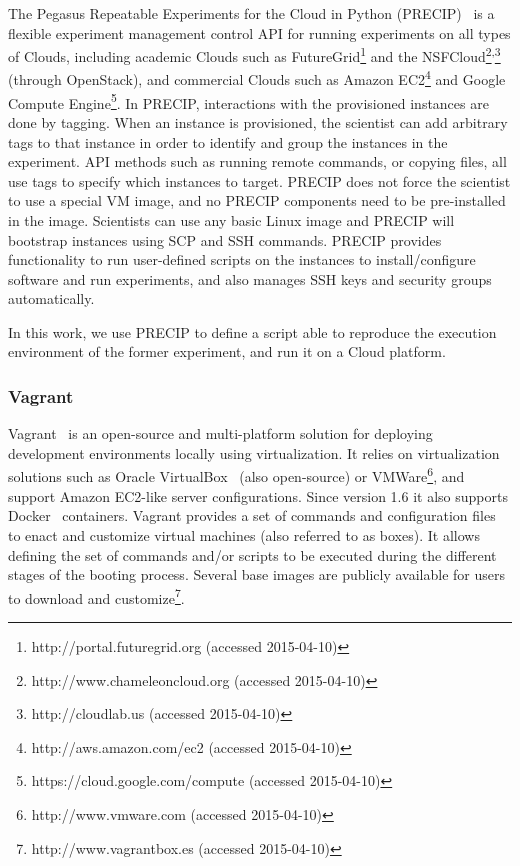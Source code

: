 The Pegasus Repeatable Experiments for the Cloud in Python (PRECIP)~\cite{Azarnoosh-CRC-2013} 
is a flexible experiment management control API for running experiments on all types of Clouds, 
including academic Clouds such as FutureGrid\footnote{http://portal.futuregrid.org (accessed 2015-04-10)} and the NSFCloud\footnote{http://www.chameleoncloud.org (accessed 2015-04-10)}\textsuperscript{,}\footnote{http://cloudlab.us (accessed 2015-04-10)}
(through OpenStack), and commercial Clouds such as Amazon EC2\footnote{http://aws.amazon.com/ec2 (accessed 2015-04-10)} and Google Compute Engine\footnote{https://cloud.google.com/compute (accessed 2015-04-10)}. In PRECIP, interactions with the provisioned instances are done by 
tagging. When an instance is provisioned, the scientist can add arbitrary tags to that instance in 
order to identify and group the instances in the experiment. API methods such as running remote 
commands, or copying files, all use tags to specify which instances to target. PRECIP does not 
force the scientist to use a special VM image, and no PRECIP components need to be pre-installed 
in the image. Scientists can use any basic Linux image and PRECIP will bootstrap instances using 
SCP and SSH commands. PRECIP provides functionality to run user-defined scripts on the instances 
to install/configure software and run experiments, and also manages SSH keys and security groups 
automatically.

In this work, we use PRECIP to define a script able to reproduce the execution environment of the 
former experiment, and run it on a Cloud platform.


\subsubsection{Vagrant}

Vagrant~\cite{palat2012introducing} is an open-source and multi-platform solution for deploying 
development environments locally using virtualization. It relies on virtualization solutions such as 
Oracle VirtualBox~\cite{Watson2008} (also open-source) or  VMWare\footnote{http://www.vmware.com (accessed 2015-04-10)}, and support 
Amazon EC2-like server configurations. Since version 1.6 it also supports Docker~\cite{Merkel2014} 
containers.
Vagrant provides a set of commands and configuration files to enact and customize virtual machines
(also referred to as boxes). It allows defining the set of commands and/or scripts to be executed during 
the different stages of the booting process. Several base images are publicly available for users to 
download and customize\footnote{http://www.vagrantbox.es (accessed 2015-04-10)}. 
 
